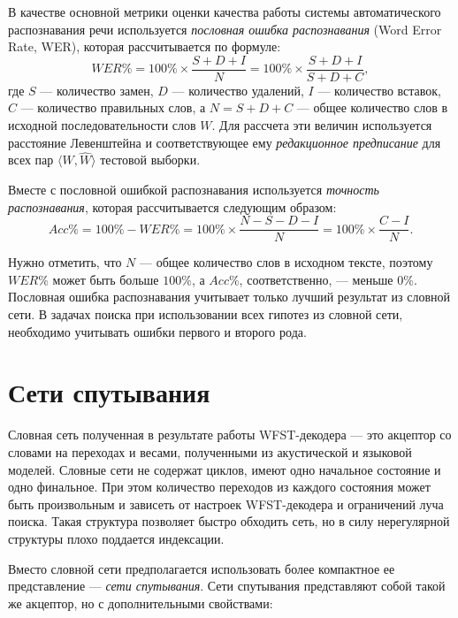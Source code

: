 В качестве основной метрики оценки качества работы системы автоматического распознавания речи используется \textit{пословная ошибка распознавания} (Word Error Rate, WER), которая рассчитывается по формуле:
\[
  WER\% = 100\% \times \frac{S+D+I}{N} = 100\% \times \frac{S+D+I}{S+D+C},
\]
где $S$ --- количество замен, $D$ --- количество удалений, $I$ --- количество вставок, $C$ --- количество правильных слов, а $N=S+D+C$ --- общее количество слов в исходной последовательности слов $W$. Для рассчета эти величин используется расстояние Левенштейна и соответствующее ему \textit{редакционное предписание} для всех пар $\langle W, \hat{W} \rangle$ тестовой выборки.

Вместе с пословной ошибкой распознавания используется \textit{точность распознавания}, которая рассчитывается следующим образом:
\[
  Acc\% = 100\% - WER\% = 100\% \times \frac{N-S-D-I}{N} = 100\% \times \frac{C-I}{N}.
\]

Нужно отметить, что $N$ --- общее количество слов в исходном тексте, поэтому $WER\%$ может быть больше $100\%$, а $Acc\%$, соответственно, --- меньше $0\%$. Пословная ошибка распознавания учитывает только лучший результат из словной сети. В задачах поиска при использовании всех гипотез из словной сети, необходимо учитывать ошибки первого и второго рода.


\section{Сети спутывания}\label{sec:ch1/confnet}

Словная сеть полученная в результате работы WFST-декодера --- это акцептор со словами на переходах и весами, полученными из акустической и языковой моделей. Словные сети не содержат циклов, имеют одно начальное состояние и одно финальное. При этом количество переходов из каждого состояния может быть произвольным и зависеть от настроек WFST-декодера и ограничений луча поиска. Такая структура позволяет быстро обходить сеть, но в силу нерегулярной структуры плохо поддается индексации.

Вместо словной сети предполагается использовать более компактное ее представление --- \textit{сети спутывания}. Сети спутывания представляют собой такой же акцептор, но с дополнительными свойствами:

